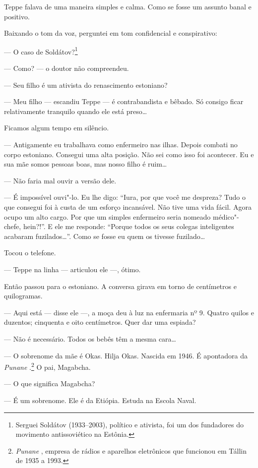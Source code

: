 Teppe falava de uma maneira simples e calma. Como se fosse um assunto
banal e positivo.

Baixando o tom da voz, perguntei em tom confidencial e conspirativo:

--- O caso de Soldátov?\footnote{Serguei Soldátov (1933--2003),
  político e ativista, foi um dos fundadores do movimento antissoviético
  na Estônia.}

--- Como? --- o doutor não compreendeu.

--- Seu filho é um ativista do renascimento estoniano?

--- Meu filho --- escandiu Teppe --- é contrabandista e bêbado. Só
consigo ficar relativamente tranquilo quando ele está preso\ldots{}

Ficamos algum tempo em silêncio.

--- Antigamente eu trabalhava como enfermeiro nas ilhas. Depois combati
no corpo estoniano. Consegui uma alta posição. Não sei como isso foi
acontecer. Eu e sua mãe somos pessoas boas, mas nosso filho é ruim\ldots{}

--- Não faria mal ouvir a versão dele.

--- É impossível ouvi"-lo. Eu lhe digo: ``Iura, por que você me despreza?
Tudo o que consegui foi à custa de um esforço incansável. Não tive uma
vida fácil. Agora ocupo um alto cargo. Por que um simples enfermeiro
seria nomeado médico"-chefe, hein?!''. E ele me responde: ``Porque todos
os seus colegas inteligentes acabaram fuzilados\ldots{}''. Como se fosse eu
quem os tivesse fuzilado\ldots{}

Tocou o telefone.

--- Teppe na linha --- articulou ele ---, ótimo.

Então passou para o estoniano. A conversa girava em torno de centímetros
e quilogramas.

--- Aqui está --- disse ele ---, a moça deu à luz na enfermaria nº 9.
Quatro quilos e duzentos; cinquenta e oito centímetros. Quer dar uma
espiada?

--- Não é necessário. Todos os bebês têm a mesma cara\ldots{}

--- O sobrenome da mãe é Okas. Hilja Okas. Nascida em 1946. É
apontadora da \emph{Punane }.\footnote{\emph{Punane
  }, empresa de rádios e aparelhos eletrônicos que funcionou em
  Tállin de 1935 a 1993.} O pai, Magabcha.

--- O que significa Magabcha?

--- É um sobrenome. Ele é da Etiópia. Estuda na Escola Naval.

